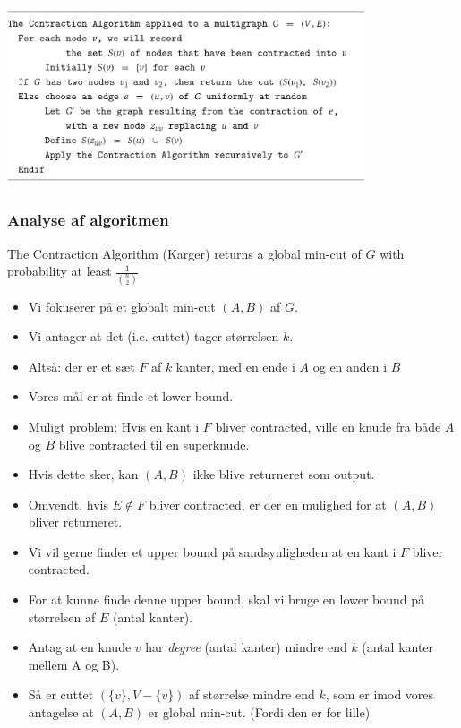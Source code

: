 \documentclass{beamer}
\begin{document}
\begin{frame}[allowframebreaks]
\begin{itemize}
\end{itemize}
\begin{center}
    \includegraphics[width=300pt]{main-6240.png}
\end{center}
\end{frame}

\begin{frame}[allowframebreaks]
  \frametitle{Analyse af algoritmen}
 \begin{theorem}
The Contraction Algorithm (Karger) returns a global min-cut of $G$ with probability at least $\frac{1}{\binom{n}{2}}$
 \end{theorem} 
 \begin{itemize}
 \item Vi fokuserer på et globalt min-cut $(A,B)$ af $G$. 
 \item Vi antager at det (i.e. cuttet) tager størrelsen $k$. 
 \item Altså: der er et sæt $F$ af $k$ kanter, med en ende i $A$ og en anden i $B$
 \item Vores mål er at finde et lower bound. 
 \item Muligt problem: Hvis en kant i $F$ bliver contracted, ville en knude fra både $A$ og $B$ blive contracted til en superknude.
 \item Hvis dette sker, kan $(A,B)$ ikke blive returneret som output. 
 \item Omvendt, hvis $E \notin F$ bliver contracted, er der en mulighed for at $(A,B)$ bliver returneret. 
 \item Vi vil gerne finder et upper bound på sandsynligheden at en kant i $F$ bliver contracted. 
 \item For at kunne finde denne upper bound, skal vi bruge en lower bound på størrelsen af $E$ (antal kanter).
 \item Antag at en knude $v$ har \textit{degree} (antal kanter) mindre end $k$ (antal kanter mellem A og B). 
 \item Så er cuttet $(\{v\}, V - \{v\})$ af størrelse mindre end $k$, som er imod vores antagelse at $(A,B)$ er global min-cut. (Fordi den er for lille)

\end{itemize}
\end{frame}
\end{document}
